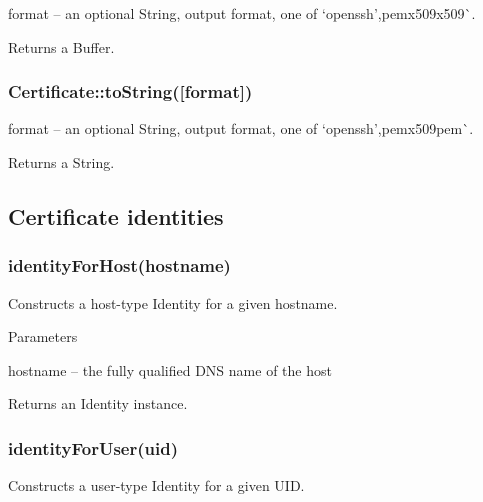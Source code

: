 \begin{DoxyItemize}
\item {\ttfamily format} -- an optional String, output format, one of `\textquotesingle{}openssh'{\ttfamily ,}\textquotesingle{}pem\textquotesingle{}x509\textquotesingle{}x509\textquotesingle{}\`{}.
\end{DoxyItemize}

Returns a Buffer.

\subsubsection*{{\ttfamily Certificate\+::to\+String(\mbox{[}format\mbox{]})}}


\begin{DoxyItemize}
\item {\ttfamily format} -- an optional String, output format, one of `\textquotesingle{}openssh'{\ttfamily ,}\textquotesingle{}pem\textquotesingle{}x509\textquotesingle{}pem\textquotesingle{}\`{}.
\end{DoxyItemize}

Returns a String.

\subsection*{Certificate identities}

\subsubsection*{{\ttfamily identity\+For\+Host(hostname)}}

Constructs a host-\/type Identity for a given hostname.

Parameters


\begin{DoxyItemize}
\item {\ttfamily hostname} -- the fully qualified D\+NS name of the host
\end{DoxyItemize}

Returns an Identity instance.

\subsubsection*{{\ttfamily identity\+For\+User(uid)}}

Constructs a user-\/type Identity for a given U\+ID.

